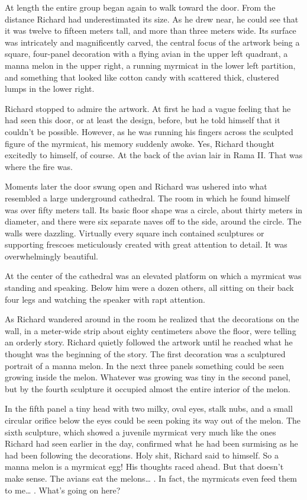 \documentclass[]{article}
\begin{document}
{{At length the entire group began again to walk toward the door. From the distance Richard had underestimated its size. As he drew near, he could see that it was twelve to fifteen meters tall, and more than three meters wide. Its surface was intricately and magnificently carved, the central focus of the artwork being a square, four-panel decoration with a flying avian in the upper left quadrant, a manna melon in the upper right, a running myrmicat in the lower left partition, and something that looked like cotton candy with scattered thick, clustered lumps in the lower right.

Richard stopped to admire the artwork. At first he had a vague feeling that he had seen this door, or at least the design, before, but he told himself that it couldn’t be possible. However, as he was running his fingers across the sculpted figure of the myrmicat, his memory suddenly awoke. Yes, Richard thought excitedly to himself, of course. At the back of the avian lair in Rama II. That was where the fire was.

Moments later the door swung open and Richard was ushered into what resembled a large underground cathedral. The room in which he found himself was over fifty meters tall. Its basic floor shape was a circle, about thirty meters in diameter, and there were six separate naves off to the side, around the circle. The walls were dazzling. Virtually every square inch contained sculptures or supporting frescoes meticulously created with great attention to detail. It was overwhelmingly beautiful.

At the center of the cathedral was an elevated platform on which a myrmicat was standing and speaking. Below him were a dozen others, all sitting on their back four legs and watching the speaker with rapt attention.

As Richard wandered around in the room he realized that the decorations on the wall, in a meter-wide strip about eighty centimeters above the floor, were telling an orderly story. Richard quietly followed the artwork until he reached what he thought was the beginning of the story. The first decoration was a sculptured portrait of a manna melon. In the next three panels something could be seen growing inside the melon. Whatever was growing was tiny in the second panel, but by the fourth sculpture it occupied almost the entire interior of the melon.

In the fifth panel a tiny head with two milky, oval eyes, stalk nubs, and a small circular orifice below the eyes could be seen poking its way out of the melon. The sixth sculpture, which showed a juvenile myrmicat very much like the ones Richard had seen earlier in the day, confirmed what he had been surmising as he had been following the decorations. Holy shit, Richard said to himself. So a manna melon is a myrmicat egg! His thoughts raced ahead. But that doesn’t make sense. The avians eat the melons… . In fact, the myrmicats even feed them to me… . What’s going on here?

}}
\end{document}
